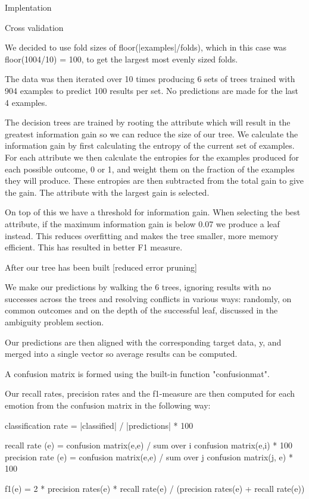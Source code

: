 Implentation

Cross validation

We decided to use fold sizes of floor(|examples|/folds), which in this case was floor(1004/10) = 100, to get the largest most evenly sized folds.

The data was then iterated over 10 times producing 6 sets of trees trained with 904 examples to predict 100 results per set. No predictions are made for the last 4 examples.

The decision trees are trained by rooting the attribute which will result in the greatest information gain so we can reduce the size of our tree. We calculate the information gain by first calculating the entropy of the current set of examples. For each attribute we then calculate the entropies for the examples produced for each possible outcome, 0 or 1, and weight them on the fraction of the examples they will produce. These entropies are then subtracted from the total gain to give the gain. The attribute with the largest gain is selected.

On top of this we have a threshold for information gain. When selecting the best attribute, if the maximum information gain is below 0.07 we produce a leaf instead. This reduces overfitting and makes the tree smaller, more memory efficient. This has resulted in better F1 measure.

After our tree has been built [reduced error pruning]

We make our predictions by walking the 6 trees, ignoring results with no successes across the trees and resolving conflicts in various ways: randomly, on common outcomes and on the depth of the successful leaf, discussed in the ambiguity problem section.

Our predictions are then aligned with the corresponding target data, y, and merged into a single vector so average results can be computed.

A confusion matrix is formed using the built-in function "confusionmat".

Our recall rates, precision rates and the f1-measure are then computed for each emotion from the confusion matrix in the following way:

classification rate = |classified| / |predictions| * 100

recall rate (e) = confusion matrix(e,e) / sum over i {confusion matrix(e,i)} * 100
precision rate (e) = confusion matrix(e,e) / sum over j {confusion matrix(j, e)} * 100

f1(e) = 2 * precision rates(e) * recall rate(e) / (precision rates(e) + recall rate(e))



